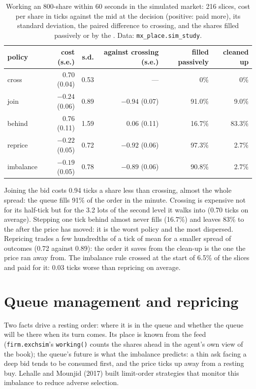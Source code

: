 \begin{table}[ht]
\centering
\small
\begin{tabular}{@{}lrrrrr@{}}
\toprule
policy & cost (s.e.) & s.d. & against crossing (s.e.) & filled passively & cleaned up \\
\midrule
cross & 0.70 (0.04) & 0.53 & --- & 0\% & 0\% \\
join & $-0.24$ (0.06) & 0.89 & $-0.94$ (0.07) & 91.0\% & 9.0\% \\
behind & 0.76 (0.11) & 1.59 & 0.06 (0.11) & 16.7\% & 83.3\% \\
reprice & $-0.22$ (0.05) & 0.72 & $-0.92$ (0.06) & 97.3\% & 2.7\% \\
imbalance & $-0.19$ (0.05) & 0.78 & $-0.89$ (0.06) & 90.8\% & 2.7\% \\
\bottomrule
\end{tabular}
\caption{Working an 800-share  within 60 seconds in the simulated market: 216 slices, cost per share in ticks against the mid at the
decision (positive: paid more), its standard deviation, the paired difference to crossing, and the shares filled passively or by the .
Data: \texttt{mx\_place.sim\_study}.}\label{tab:mx:child-order-placement:policies}
\end{table}

Joining the bid costs 0.94 ticks a share less than crossing, almost the whole spread: the queue fills 91\% of the order in the minute. Crossing is
expensive not for its half-tick but for the 3.2 lots of the second level it walks into (0.70 ticks on average). Stepping one tick behind almost never
fills (16.7\%) and leaves 83\% to the  after the price has moved: it is the worst policy and the most dispersed. Repricing trades a few
hundredths of a tick of mean for a smaller spread of outcomes (0.72 against 0.89): the order it saves from the clean-up is the one the price ran away
from. The imbalance rule crossed at the start of 6.5\% of the slices and paid for it: 0.03 ticks worse than repricing on average.

\section{Queue management and repricing}

Two facts drive a resting order: where it is in the queue and whether the queue will be there when its turn comes. Its place is known from the
feed (\texttt{firm.exchsim}'s \texttt{working()} counts the shares ahead in the agent's own view of the book); the queue's future is what the imbalance
predicts: a thin ask facing a deep bid tends to be consumed first, and the price ticks up away from a resting buy. Lehalle and Mounjid (2017) built
limit-order strategies that monitor this imbalance to reduce adverse selection.

